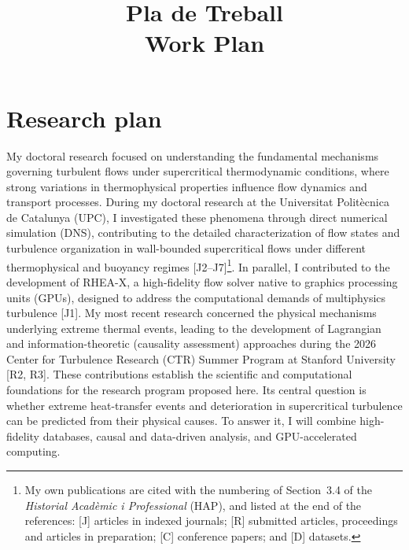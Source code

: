 \documentclass[11pt]{article}
\title{\textbf{Pla de Treball}\\[2pt]\large Work Plan}
\author{\Large \CandName}
\date{}
\newcommand{\NEW}[1]{\iffinal #1\else{\color{red}#1}\fi}
\begin{document}
\maketitle
\thispagestyle{plain}
\vspace{0.5cm}
\begin{center}\postdata\end{center}

\newpage
\tableofcontents

\section{Research plan}\label{sec:research}

My doctoral research focused on understanding the fundamental mechanisms governing turbulent flows under supercritical thermodynamic conditions, where strong variations in thermophysical properties influence flow dynamics and transport processes.
During my doctoral research at the Universitat Politècnica de Catalunya (UPC), I investigated these phenomena through direct numerical simulation (DNS), contributing to the detailed characterization of flow states and turbulence organization in wall-bounded supercritical flows under different thermophysical and buoyancy regimes [J2--J7]\footnote{My own publications are cited with the numbering of Section~3.4 of the \textit{Historial Acadèmic i Professional} (HAP), and listed at the end of the references: [J] articles in indexed journals; [R] submitted articles, proceedings and articles in preparation; [C] conference papers; and [D] datasets.}.
In parallel, I contributed to the development of RHEA-X, a high-fidelity flow solver \NEW{native to graphics processing units (GPUs),} designed to address the computational demands of multiphysics turbulence [J1].
My most recent research concerned the physical mechanisms underlying extreme thermal events, leading to the development of Lagrangian and information-theoretic (causality assessment) approaches during the 2026 Center for Turbulence Research (CTR) Summer Program at Stanford University [R2, R3].
These contributions establish the scientific and computational foundations for the research program proposed here.
Its central question is whether extreme heat-transfer events and deterioration in supercritical turbulence can be predicted from their physical causes. To answer it, I will combine high-fidelity databases, causal and data-driven analysis, and GPU-accelerated computing.
\end{document}
